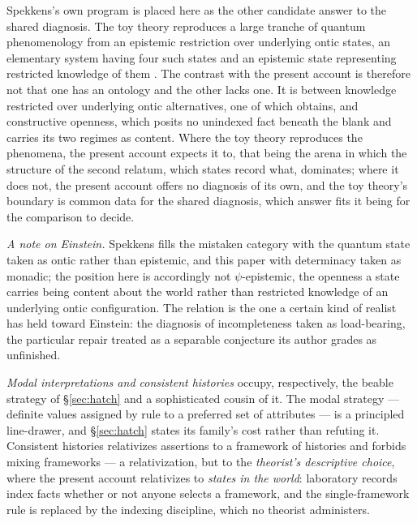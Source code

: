 Spekkens's own program is placed here as the other candidate answer to the shared diagnosis. The toy theory reproduces a large tranche of quantum phenomenology from an epistemic restriction over underlying ontic states, an elementary system having four such states and an epistemic state representing restricted knowledge of them \cite{spekkens2007evidence}. The contrast with the present account is therefore not that one has an ontology and the other lacks one. It is between knowledge restricted over underlying ontic alternatives, one of which obtains, and constructive openness, which posits no unindexed fact beneath the blank and carries its two regimes as content. Where the toy theory reproduces the phenomena, the present account expects it to, that being the arena in which the structure of the second relatum, which states record what, dominates; where it does not, the present account offers no diagnosis of its own, and the toy theory's boundary is common data for the shared diagnosis, which answer fits it being for the comparison to decide.

\textit{A note on Einstein.} Spekkens fills the mistaken category with the quantum state taken as ontic rather than epistemic, and this paper with determinacy taken as monadic; the position here is accordingly not $\psi$-epistemic, the openness a state carries being content about the world rather than restricted knowledge of an underlying ontic configuration. The relation is the one a certain kind of realist has held toward Einstein: the diagnosis of incompleteness taken as load-bearing, the particular repair treated as a separable conjecture its author grades as unfinished.

\emph{Modal interpretations and consistent histories} occupy, respectively, the beable strategy of \S\ref{sec:hatch} and a sophisticated cousin of it. The modal strategy --- definite values assigned by rule to a preferred set of attributes \cite{lombardi2021modal} --- is a principled line-drawer, and \S\ref{sec:hatch} states its family's cost rather than refuting it. Consistent histories \cite{griffiths2002consistent} relativizes assertions to a framework of histories and forbids mixing frameworks --- a relativization, but to the \emph{theorist's descriptive choice}, where the present account relativizes to \emph{states in the world}: laboratory records index facts whether or not anyone selects a framework, and the single-framework rule is replaced by the indexing discipline, which no theorist administers.

